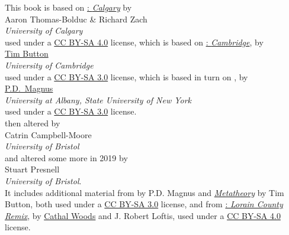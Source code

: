 \noindent
 \small This book is based on \href{https://github.com/rzach/forallx-yyc/}{\forallx: \emph{Calgary}} by\\[2ex] {Aaron Thomas-Bolduc \& Richard Zach}\\
 \emph{University of Calgary}
 \\[2ex]
used under a \href{https://creativecommons.org/licenses/by-sa/4.0/}{CC BY-SA 4.0} license, which is based on \href{http://people.ds.cam.ac.uk/tecb2/forallx.shtml}{\forallx:\emph{ Cambridge}}, by\\[2ex]
\href{http://people.ds.cam.ac.uk/tecb2/index.shtml}{Tim Button}\\
\emph{University of Cambridge}\\[2ex]
used under a \href{https://creativecommons.org/licenses/by-sa/3.0/}{CC BY-SA 3.0} license, which is based in turn on \href{https://www.fecundity.com/logic/}{\forallx}, by\\[2ex]
\href{https://www.fecundity.com/job/}{P.D.\ Magnus}\\
\emph{University at Albany, State University of New York}\\[2ex]
used under a \href{https://creativecommons.org/licenses/by-sa/3.0/}{CC BY-SA 3.0} license.
\\
then altered by \\[2ex] {Catrin Campbell-Moore}\\\emph{University of Bristol}
\\
and altered some more in 2019 by \\[2ex]
{Stuart Presnell}\\\emph{University of Bristol}.
\\[2ex]
It includes additional material from \forallx{} by P.D. Magnus
and \href{http://people.ds.cam.ac.uk/tecb2/metatheory.shtml}{\emph{Metatheory}} by Tim Button, both used under
a \href{https://creativecommons.org/licenses/by-sa/3.0/}{CC BY-SA 3.0}
license, and from \href{https://github.com/rob-helpy-chalk/openintroduction}{\forallx: \emph{Lorain County Remix}}, by \href{https://sites.google.com/site/cathalwoods/}{Cathal
Woods} and J. Robert Loftis, used under
a \href{https://creativecommons.org/licenses/by-sa/4.0/}{CC BY-SA 4.0}
license.

\bigskip

